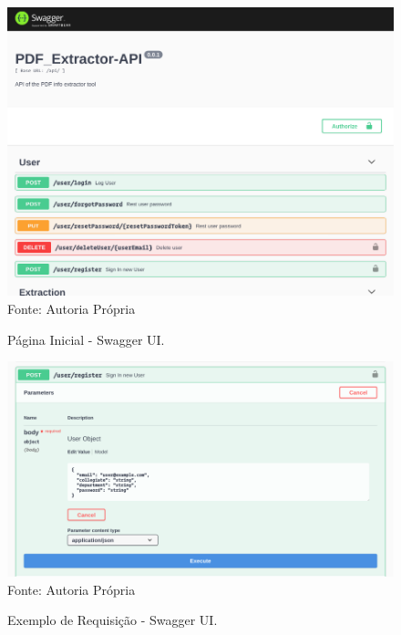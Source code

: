 \begin{figure}[H]
\centering
\captionsetup{justification   = raggedright,
              singlelinecheck = false}
\caption{Página Inicial - Swagger UI.}\label{swaggerHome}
\includegraphics[width=1\textwidth]{figs/SwaggerUIHome.png}
\footnotesize Fonte: Autoria Própria
\end{figure}

\begin{figure}[H]
\centering
\captionsetup{justification   = raggedright,
              singlelinecheck = false}
\caption{Exemplo de Requisição - Swagger UI.}\label{swaggerRequest}
\includegraphics[width=1\textwidth]{figs/SwaggerUIExample.png}
\footnotesize Fonte: Autoria Própria
\end{figure}

